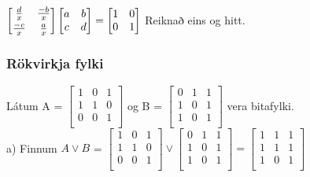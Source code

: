 $\begin{bmatrix}
    \frac{d}{x} & \frac{-b}{x}\vspace*{0.2em} \\
    \frac{-c}{x} & \frac{a}{x} \\
\end{bmatrix}
\begin{bmatrix}
    a & b \\
    c & d \\
\end{bmatrix} = 
\begin{bmatrix}
    1 & 0 \\
    0 & 1 \\
\end{bmatrix}$ Reiknað eins og hitt.\\

\newpage
\subsubsection{Rökvirkja fylki}
Látum A = 
$\begin{bmatrix}
    1 & 0 & 1 \\
    1 & 1 & 0 \\
    0 & 0 & 1 \\
\end{bmatrix}$ og B = 
$\begin{bmatrix}
    0 & 1 & 1 \\
    1 & 0 & 1 \\
    1 & 0 & 1 \\
\end{bmatrix}$ vera bitafylki.\vspace*{1em}\\
a) Finnum $A \vee B$ = 
$\begin{bmatrix}
    1 & 0 & 1 \\
    1 & 1 & 0 \\
    0 & 0 & 1 \\
\end{bmatrix}\vee 
\begin{bmatrix}
    0 & 1 & 1 \\
    1 & 0 & 1 \\
    1 & 0 & 1 \\
\end{bmatrix} = 
\begin{bmatrix}
    1 & 1 & 1 \\
    1 & 1 & 1 \\
    1 & 0 & 1 \\
\end{bmatrix}$\vspace*{1em} \\
